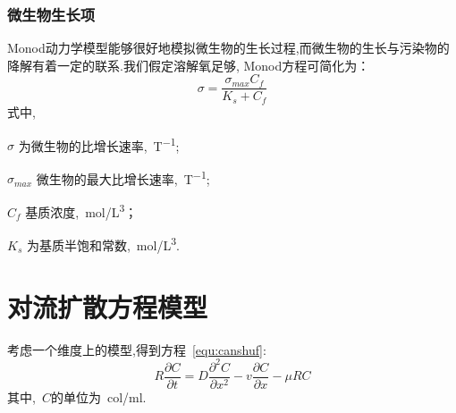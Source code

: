 \subsubsection{微生物生长项}
Monod动力学模型能够很好地模拟微生物的生长过程,而微生物的生长与污染物的降解有着一定的联系.我们假定溶解氧足够,
Monod方程可简化为：
\begin{equation}
\sigma = \dfrac{\sigma_{max}C_f}{K_s+C_f}
\end{equation}
式中,
\begin{paralist}
	\item[$\sigma$]为微生物的比增长速率,\SI{}{T^{-1}};
	\item[$\sigma_{max}$]微生物的最大比增长速率,\SI{}{T^{-1}};
	\item[$C_f$]基质浓度,\SI{}{mol/L^3}；
	\item[$K_s$]为基质半饱和常数,\SI{}{mol/L^3}.
\end{paralist}
\section{对流扩散方程模型}
考虑一个维度上的模型,得到方程~\eqref{equ:canshuf}:
\begin{equation}\label{equ:canshuf}
	R\dfrac{\partial C}{\partial t} = D\dfrac{\partial^2 C}{\partial x^2}-v\dfrac{\partial C}{\partial x}-\mu RC
\end{equation}
其中,~$C$的单位为\SI{}{col/ml}.\par

